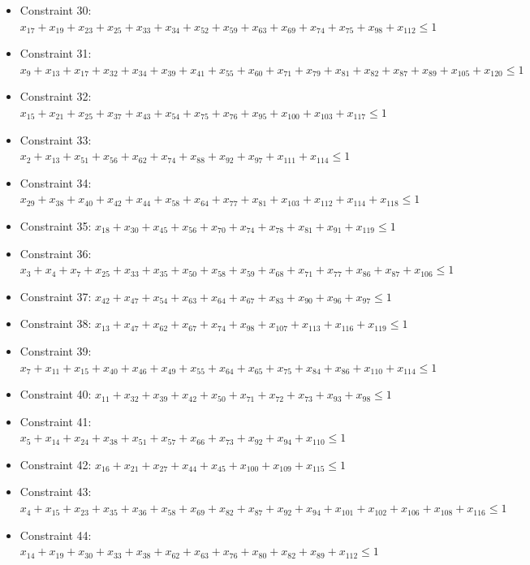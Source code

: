 \documentclass[11pt]{article}
\begin{document}
\begin{itemize}
\item Constraint 30: $x_{17} + x_{19} + x_{23} + x_{25} + x_{33} + x_{34} + x_{52} + x_{59} + x_{63} + x_{69} + x_{74} + x_{75} + x_{98} + x_{112} \le 1$
\item Constraint 31: $x_{9} + x_{13} + x_{17} + x_{32} + x_{34} + x_{39} + x_{41} + x_{55} + x_{60} + x_{71} + x_{79} + x_{81} + x_{82} + x_{87} + x_{89} + x_{105} + x_{120} \le 1$
\item Constraint 32: $x_{15} + x_{21} + x_{25} + x_{37} + x_{43} + x_{54} + x_{75} + x_{76} + x_{95} + x_{100} + x_{103} + x_{117} \le 1$
\item Constraint 33: $x_{2} + x_{13} + x_{51} + x_{56} + x_{62} + x_{74} + x_{88} + x_{92} + x_{97} + x_{111} + x_{114} \le 1$
\item Constraint 34: $x_{29} + x_{38} + x_{40} + x_{42} + x_{44} + x_{58} + x_{64} + x_{77} + x_{81} + x_{103} + x_{112} + x_{114} + x_{118} \le 1$
\item Constraint 35: $x_{18} + x_{30} + x_{45} + x_{56} + x_{70} + x_{74} + x_{78} + x_{81} + x_{91} + x_{119} \le 1$
\item Constraint 36: $x_{3} + x_{4} + x_{7} + x_{25} + x_{33} + x_{35} + x_{50} + x_{58} + x_{59} + x_{68} + x_{71} + x_{77} + x_{86} + x_{87} + x_{106} \le 1$
\item Constraint 37: $x_{42} + x_{47} + x_{54} + x_{63} + x_{64} + x_{67} + x_{83} + x_{90} + x_{96} + x_{97} \le 1$
\item Constraint 38: $x_{13} + x_{47} + x_{62} + x_{67} + x_{74} + x_{98} + x_{107} + x_{113} + x_{116} + x_{119} \le 1$
\item Constraint 39: $x_{7} + x_{11} + x_{15} + x_{40} + x_{46} + x_{49} + x_{55} + x_{64} + x_{65} + x_{75} + x_{84} + x_{86} + x_{110} + x_{114} \le 1$
\item Constraint 40: $x_{11} + x_{32} + x_{39} + x_{42} + x_{50} + x_{71} + x_{72} + x_{73} + x_{93} + x_{98} \le 1$
\item Constraint 41: $x_{5} + x_{14} + x_{24} + x_{38} + x_{51} + x_{57} + x_{66} + x_{73} + x_{92} + x_{94} + x_{110} \le 1$
\item Constraint 42: $x_{16} + x_{21} + x_{27} + x_{44} + x_{45} + x_{100} + x_{109} + x_{115} \le 1$
\item Constraint 43: $x_{4} + x_{15} + x_{23} + x_{35} + x_{36} + x_{58} + x_{69} + x_{82} + x_{87} + x_{92} + x_{94} + x_{101} + x_{102} + x_{106} + x_{108} + x_{116} \le 1$
\item Constraint 44: $x_{14} + x_{19} + x_{30} + x_{33} + x_{38} + x_{62} + x_{63} + x_{76} + x_{80} + x_{82} + x_{89} + x_{112} \le 1$

\end{itemize}
\end{document}
